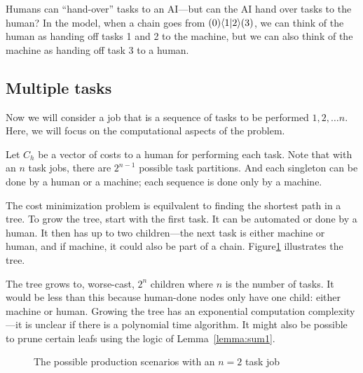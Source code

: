 \documentclass{article}
\begin{document}
Humans can ``hand-over'' tasks to an AI---but can the AI hand over tasks to the human?
In the model, when a chain goes from $( 0 )\langle 1|2 \rangle( 3 )$, we can think of the human as handing off tasks 1 and 2 to the machine, but we can also think of the machine as handing off task 3 to a human.

\subsection{Multiple tasks}
Now we will consider a job that is a sequence of tasks to be performed $1, 2, \ldots n$.
Here, we will focus on the computational aspects of the problem.

Let $C_h$ be a vector of costs to a human for performing each task.
Note that with an $n$ task jobs, there are $2^{n-1}$ possible task partitions.
And each singleton can be done by a human or a machine; each sequence is done only by a machine.

The cost minimization problem is equilvalent to finding the shortest path in a tree.
To grow the tree, start with the first task.
It can be automated or done by a human.
It then has up to two children---the next task is either machine or human, and if machine, it could also be part of a chain.
Figure\ref{fig:tree} illustrates the tree. 

The tree grows to, worse-cast, $2^n$ children where $n$ is the number of tasks.
It would be less than this because human-done nodes only have one child: either machine or human.
Growing the tree has an exponential computation complexity---it is unclear if there is a polynomial time algorithm.
It might also be possible to prune certain leafs using the logic of Lemma~\ref{lemma:sum1}.

\begin{figure}
\caption{The possible production scenarios with an $n=2$ task job}
\label{fig:tree}
\end{figure}
\end{document}
